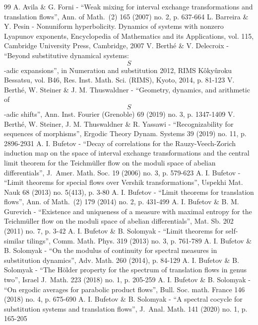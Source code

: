 \begin{thebibliography}{99}
 A. Avila \& G. Forni - “Weak mixing for interval exchange transformations and translation flows”, Ann. of Math. (2) 165 (2007) no. 2, p. 637-664
 L. Barreira \& Y. Pesin - Nonuniform hyperbolicity. Dynamics of systems with nonzero Lyapunov exponents, Encyclopedia of Mathematics and its Applications, vol. 115, Cambridge University Press, Cambridge, 2007
 V. Berthé \& V. Delecroix - “Beyond substitutive dynamical systems: $$S$$-adic expansions”, in Numeration and substitution 2012, RIMS Kôkyûroku Bessatsu, vol. B46, Res. Inst. Math. Sci. (RIMS), Kyoto, 2014, p. 81-123
 V. Berthé, W. Steiner \& J. M. Thuswaldner - “Geometry, dynamics, and arithmetic of $$S$$-adic shifts”, Ann. Inst. Fourier (Grenoble) 69 (2019) no. 3, p. 1347-1409
 V. Berthé, W. Steiner, J. M. Thuswaldner \& R. Yassawi - “Recognizability for sequences of morphisms”, Ergodic Theory Dynam. Systems 39 (2019) no. 11, p. 2896-2931
 A. I. Bufetov - “Decay of correlations for the Rauzy-Veech-Zorich induction map on the space of interval exchange transformations and the central limit theorem for the Teichmüller flow on the moduli space of abelian differentials”, J. Amer. Math. Soc. 19 (2006) no. 3, p. 579-623
 A. I. Bufetov - “Limit theorems for special flows over Vershik transformations”, Uspekhi Mat. Nauk 68 (2013) no. 5(413), p. 3-80
 A. I. Bufetov - “Limit theorems for translation flows”, Ann. of Math. (2) 179 (2014) no. 2, p. 431-499
 A. I. Bufetov \& B. M. Gurevich - “Existence and uniqueness of a measure with maximal entropy for the Teichmüller flow on the moduli space of abelian differentials”, Mat. Sb. 202 (2011) no. 7, p. 3-42
 A. I. Bufetov \& B. Solomyak - “Limit theorems for self-similar tilings”, Comm. Math. Phys. 319 (2013) no. 3, p. 761-789
 A. I. Bufetov \& B. Solomyak - “On the modulus of continuity for spectral measures in substitution dynamics”, Adv. Math. 260 (2014), p. 84-129
 A. I. Bufetov \& B. Solomyak - “The Hölder property for the spectrum of translation flows in genus two”, Israel J. Math. 223 (2018) no. 1, p. 205-259
 A. I. Bufetov \& B. Solomyak - “On ergodic averages for parabolic product flows”, Bull. Soc. math. France 146 (2018) no. 4, p. 675-690
 A. I. Bufetov \& B. Solomyak - “A spectral cocycle for substitution systems and translation flows”, J. Anal. Math. 141 (2020) no. 1, p. 165-205

\end{thebibliography}
